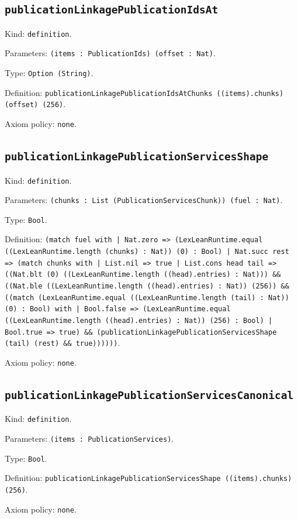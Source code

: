 \documentclass[11pt]{article}
\begin{document}
\subsection*{\texttt{publicationLinkagePublicationIdsAt}}
\noindent Kind: \texttt{definition}.\par
\noindent Parameters: \texttt{(items : PublicationIds) (offset : Nat)}.\par
\noindent Type: \texttt{Option (String)}.\par
\noindent Definition: \texttt{publicationLinkagePublicationIdsAtChunks ((items).chunks) (offset) (256)}.\par
\noindent Axiom policy: \texttt{none}.\par
\subsection*{\texttt{publicationLinkagePublicationServicesShape}}
\noindent Kind: \texttt{definition}.\par
\noindent Parameters: \texttt{(chunks : List (PublicationServicesChunk)) (fuel : Nat)}.\par
\noindent Type: \texttt{Bool}.\par
\noindent Definition: \texttt{(match fuel with | Nat.zero => (LexLeanRuntime.equal ((LexLeanRuntime.length (chunks) : Nat)) (0) : Bool) | Nat.succ rest => (match chunks with | List.nil => true | List.cons head tail => ((Nat.blt (0) ((LexLeanRuntime.length ((head).entries) : Nat))) \&\& ((Nat.ble ((LexLeanRuntime.length ((head).entries) : Nat)) (256)) \&\& ((match (LexLeanRuntime.equal ((LexLeanRuntime.length (tail) : Nat)) (0) : Bool) with | Bool.false => (LexLeanRuntime.equal ((LexLeanRuntime.length ((head).entries) : Nat)) (256) : Bool) | Bool.true => true) \&\& (publicationLinkagePublicationServicesShape (tail) (rest) \&\& true))))))}.\par
\noindent Axiom policy: \texttt{none}.\par
\subsection*{\texttt{publicationLinkagePublicationServicesCanonical}}
\noindent Kind: \texttt{definition}.\par
\noindent Parameters: \texttt{(items : PublicationServices)}.\par
\noindent Type: \texttt{Bool}.\par
\noindent Definition: \texttt{publicationLinkagePublicationServicesShape ((items).chunks) (256)}.\par
\noindent Axiom policy: \texttt{none}.\par
\end{document}
